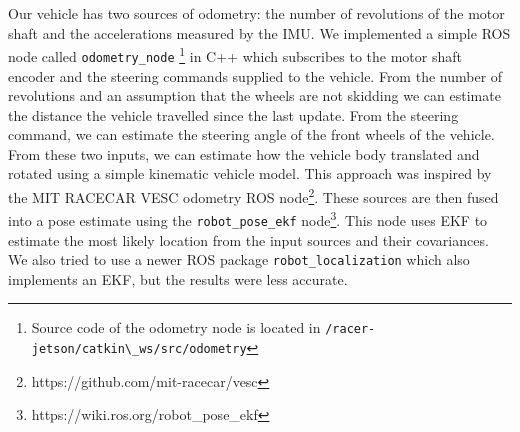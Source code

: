 Our vehicle has two sources of odometry: the number of revolutions of the motor shaft and the accelerations measured by the IMU. We implemented a simple \gls*{ROS} node called \verb|odometry_node| \footnote{Source code of the odometry node is located in \verb|/racer-jetson/catkin\_ws/src/odometry|} in C++ which subscribes to the motor shaft encoder and the steering commands supplied to the vehicle. From the number of revolutions and an assumption that the wheels are not skidding we can estimate the distance the vehicle travelled since the last update. From the steering command, we can estimate the steering angle of the front wheels of the vehicle. From these two inputs, we can estimate how the vehicle body translated and rotated using a simple kinematic vehicle model. This approach was inspired by the MIT RACECAR VESC odometry \gls*{ROS} node\footnote{https://github.com/mit-racecar/vesc}. These sources are then fused into a pose estimate using the \verb|robot_pose_ekf| node\footnote{https://wiki.ros.org/robot\_pose\_ekf}. This node uses \gls*{EKF} to estimate the most likely location from the input sources and their covariances. We also tried to use a newer \gls*{ROS} package \verb|robot_localization| which also implements an \gls*{EKF}, but the results were less accurate.


